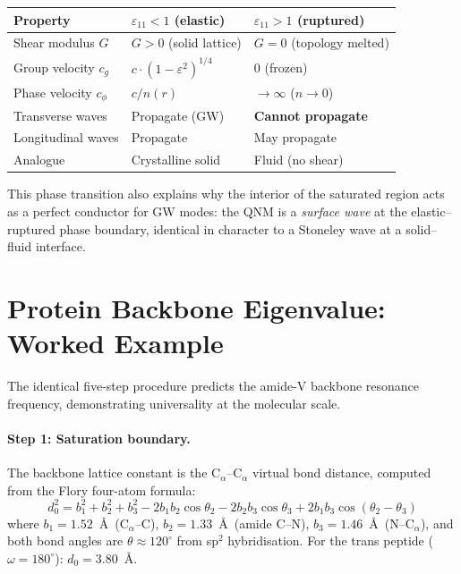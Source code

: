 \begin{center}
\renewcommand{\arraystretch}{1.3}
\begin{tabular}{l l l}
\toprule
\textbf{Property} & \textbf{$\varepsilon_{11} < 1$ (elastic)} & \textbf{$\varepsilon_{11} > 1$ (ruptured)} \\
\midrule
Shear modulus $G$ & $G > 0$ (solid lattice) & $G = 0$ (topology melted) \\
Group velocity $c_g$ & $c \cdot (1 - \varepsilon^2)^{1/4}$ & 0 (frozen) \\
Phase velocity $c_\phi$ & $c / n(r)$ & $\to \infty$ ($n \to 0$) \\
Transverse waves & Propagate (GW) & \textbf{Cannot propagate} \\
Longitudinal waves & Propagate & May propagate \\
Analogue & Crystalline solid & Fluid (no shear) \\
\bottomrule
\end{tabular}
\end{center}

\noindent This phase transition also explains why the interior of the saturated region acts as a perfect conductor for GW modes: the QNM is a \textit{surface wave} at the elastic--ruptured phase boundary, identical in character to a Stoneley wave at a solid--fluid interface.


\section{Protein Backbone Eigenvalue: Worked Example}
\label{sec:protein_eigenvalue}

The identical five-step procedure predicts the amide-V backbone resonance frequency, demonstrating universality at the molecular scale.

\paragraph{Step 1: Saturation boundary.}
The backbone lattice constant is the C$_\alpha$--C$_\alpha$ virtual bond distance, computed from the Flory four-atom formula:
\begin{equation}
    d_0^2 = b_1^2 + b_2^2 + b_3^2 - 2b_1 b_2 \cos\theta_2 - 2b_2 b_3 \cos\theta_3 + 2b_1 b_3 \cos(\theta_2 - \theta_3)
    \label{eq:flory}
\end{equation}
where $b_1 = 1.52$~\AA\ (C$_\alpha$--C), $b_2 = 1.33$~\AA\ (amide C--N), $b_3 = 1.46$~\AA\ (N--C$_\alpha$), and both bond angles are $\theta \approx 120^\circ$ from sp$^2$ hybridisation. For the trans peptide ($\omega = 180^\circ$): $d_0 = 3.80$~\AA.

